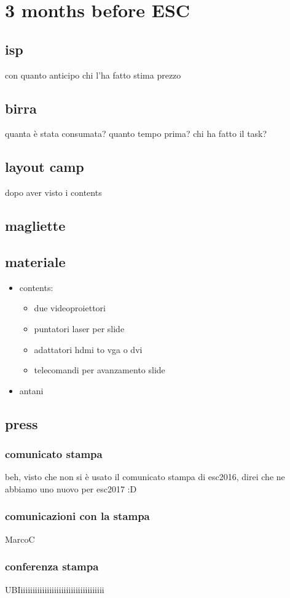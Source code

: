 \chapter{3 months before ESC}

\section{isp}
con quanto anticipo
chi l'ha fatto 
stima prezzo

\section{birra}
quanta è stata consumata?
quanto tempo prima?
chi ha fatto il task?

\section{layout camp}
dopo aver visto i contents

\section{magliette}


\section{materiale}
\begin{itemize}
\item contents:
\begin{itemize}
\item due videoproiettori
\item puntatori laser per slide
\item adattatori hdmi to vga o dvi
\item telecomandi per avanzamento slide
\end{itemize}

\item antani
\end{itemize}

\section{press}

\subsection{comunicato stampa}
beh, visto che non si \`e usato il comunicato stampa di esc2016, direi che ne abbiamo uno nuovo per esc2017 :D

\subsection{comunicazioni con la stampa}
MarcoC

\subsection{conferenza stampa}
UBIiiiiiiiiiiiiiiiiiiiiiiiiiiiiiiiiiii